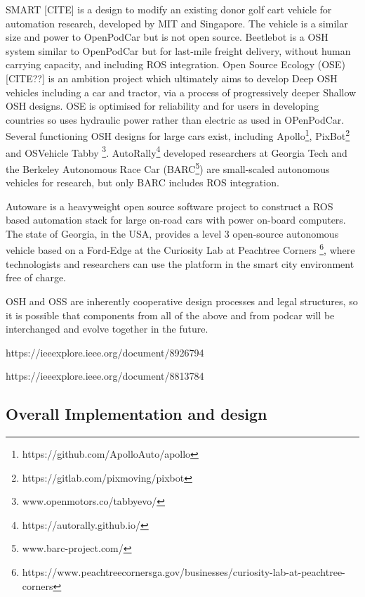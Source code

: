 \documentclass[a4paper]{article}
\begin{document}
SMART [CITE] is a design to modify an existing donor golf cart vehicle for automation research, developed by MIT and Singapore.  The vehicle is a similar size and power to OpenPodCar but is not open source.
Beetlebot \cite{beetlebot} is a OSH system similar to OpenPodCar but for last-mile freight delivery, without human carrying capacity, and including ROS integration.
Open Source Ecology (OSE) [CITE??] is an ambition project which ultimately aims to develop Deep OSH vehicles including a car and tractor, via a process of progressively deeper Shallow OSH designs.  OSE is optimised for reliability and for users in developing countries so uses hydraulic power rather than electric as used in OPenPodCar.
Several functioning OSH designs for large cars exist, including Apollo\footnote{https://github.com/ApolloAuto/apollo}, PixBot\footnote{https://gitlab.com/pixmoving/pixbot} and OSVehicle Tabby \footnote{www.openmotors.co/tabbyevo/}.  AutoRally\footnote{https://autorally.github.io/} \cite{goldfain2019autorally} developed researchers at Georgia Tech and the Berkeley Autonomous Race Car (BARC\footnote{www.barc-project.com/}) are small-scaled autonomous vehicles for research, but only BARC includes ROS integration. 

Autoware \cite{kato2018autoware} is a heavyweight open source software project to construct a ROS based automation stack for large on-road cars with power on-board computers.
The state of Georgia, in the USA, provides a level 3 open-source autonomous vehicle based on a Ford-Edge at the Curiosity Lab at Peachtree Corners \footnote{https://www.peachtreecornersga.gov/businesses/curiosity-lab-at-peachtree-corners}, where technologists and researchers can use the platform in the smart city environment free of charge.


OSH and OSS are inherently cooperative design processes and legal structures, so it is possible that components from all of the above and from podcar will be interchanged and evolve together in the future.

https://ieeexplore.ieee.org/document/8926794


https://ieeexplore.ieee.org/document/8813784



\subsection{Overall Implementation and design}\label{h.1u7vph94gfbt}

\end{document}

